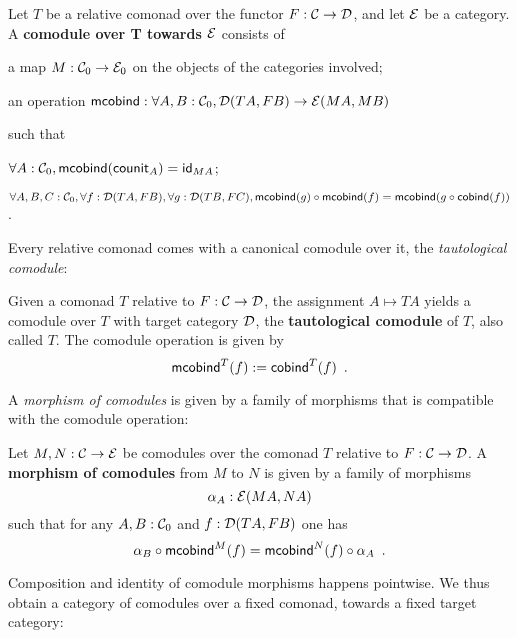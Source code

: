 \documentclass{amsart}
\newcommand{\fat}[1]{\textbf{#1}}
\begin{document}
\begin{definition}\label{def:comodule}
 Let $T$ be a relative comonad over the functor $F:\C\to\D$, and let $\E$ be a category.
 A \fat{comodule over T towards $\E$} consists of
   \begin{packitem}
   \item a map $M:\C_0 \to \E_0$ on the objects of the categories involved;
   \item an operation $\mcobind: \forall A,B:\C_0, \D(TA,FB) \to \E(MA,MB)$
  \end{packitem}
  such that 
  \begin{packitem}
   \item $\forall A : \C_0, \mcobind(\counit_A) = \id_{MA}$;
   \item $\forall A,B,C:\C_0, \forall f : \D(TA,FB),\forall g:\D(TB,FC), \\
        \comp{\mcobind(f)}{\mcobind(g)} = \mcobind(\comp{\cobind(f)}{g})$ .
  \end{packitem}

\end{definition}

Every relative comonad comes with a canonical comodule over it, the \emph{tautological comodule}:

\begin{definition}\label{def:tautological_comodule}
  Given a comonad $T$ relative to $F:\C\to\D$, the assignment $A \mapsto TA$ yields a comodule over $T$ 
  with target category $\D$, the \textbf{tautological comodule} of $T$, also called $T$.
  The comodule operation is given by
    \[  \mcobind^T(f) := \cobind^T(f) \enspace . \]
\end{definition}


A \emph{morphism of comodules} is given by a family of morphisms that is compatible with 
the comodule operation:

\begin{definition}\label{def:morphism_of_comodules}
 Let $M, N : \C \to \E$ be comodules over the comonad $T$ relative to  $F:\C \to \D$.
 A \fat{morphism of comodules} from $M$ to $N$ is given by a family of morphisms 
   \[ \alpha_A:\E(MA,NA) \]
 such that for any $A,B:\C_0$ and $f : \D(TA,FB)$ one has
 \[   \comp{\mcobind^M(f)}{\alpha_B} = \comp{\alpha_A}{\mcobind^N(f)} \enspace . \]
\end{definition}


Composition and identity of comodule morphisms happens pointwise. We thus obtain a category of comodules
over a fixed comonad, towards a fixed target category:
\end{document}
